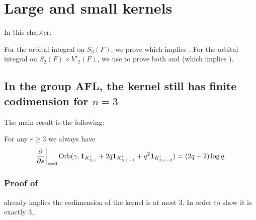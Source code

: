 \chapter{Large and small kernels}
\label{ch:ker}

In this chapter:
\begin{itemize}
  \ii For the orbital integral on $S_3(F)$,
  we prove  which implies .
  \ii For the orbital integral on $S_2(F) \times V'_2(F)$,
  we use  to prove
  both  and
   (which implies ).
\end{itemize}

\section{In the group AFL, the kernel still has finite codimension for $n=3$}
The main result is the following:
\begin{theorem}
  \label{thm:large_kernel_group_full}
  For any $r \ge 3$ we always have
  \[ \left. \pdv{}{s} \right\rvert_{s=0}
    \operatorname{Orb}(\gamma, \mathbf{1}_{K'_{S, r}} + 2q \mathbf{1}_{K'_{S, r-1}}
    + q^2 \mathbf{1}_{K'_{S, r-2}}) = (2q+2) \log q. \]
\end{theorem}

\subsection{Proof of }
 already implies the codimension of the kernel is at most $3$.
In order to show it is exactly $3$,.

